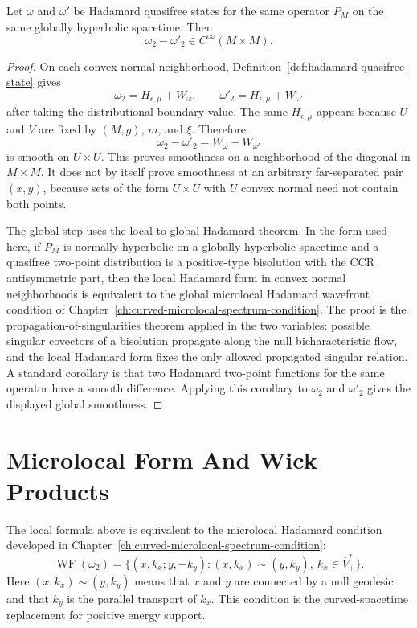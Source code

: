\begin{proposition}
\label{prop:hadamard-state-independent-subtraction}
Let \(\omega\) and \(\omega'\) be Hadamard quasifree states for the same
operator \(P_M\) on the same globally hyperbolic spacetime.  Then
\[
  \omega_2-\omega'_2\in C^\infty(M\times M).
\]
\end{proposition}

\begin{proof}
On each convex normal neighborhood, Definition~\ref{def:hadamard-quasifree-state}
gives
\[
  \omega_2=H_{\epsilon,\mu}+W_\omega,
  \qquad
  \omega'_2=H_{\epsilon,\mu}+W_{\omega'}
\]
after taking the distributional boundary value.  The same
\(H_{\epsilon,\mu}\) appears because \(U\) and \(V\) are fixed by
\((M,g)\), \(m\), and \(\xi\).  Therefore
\[
  \omega_2-\omega'_2=W_\omega-W_{\omega'}
\]
is smooth on \(U\times U\).  This proves smoothness on a neighborhood of the
diagonal in \(M\times M\).  It does not by itself prove smoothness at an
arbitrary far-separated pair \((x,y)\), because sets of the form \(U\times U\)
with \(U\) convex normal need not contain both points.

The global step uses the local-to-global Hadamard theorem.  In the form used
here, if \(P_M\) is normally hyperbolic on a globally hyperbolic spacetime and
a quasifree two-point distribution is a positive-type bisolution with the
CCR antisymmetric part, then the local Hadamard form in convex normal
neighborhoods is equivalent to the global microlocal Hadamard wavefront
condition of Chapter~\ref{ch:curved-microlocal-spectrum-condition}.  The
proof is the propagation-of-singularities theorem applied in the two
variables: possible singular covectors of a bisolution propagate along the
null bicharacteristic flow, and the local Hadamard form fixes the only
allowed propagated singular relation.  A standard corollary is that two
Hadamard two-point functions for the same operator have a smooth difference.
Applying this corollary to \(\omega_2\) and \(\omega'_2\) gives the displayed
global smoothness.
\end{proof}

\section{Microlocal Form And Wick Products}

The local formula above is equivalent to the microlocal Hadamard condition
developed in Chapter~\ref{ch:curved-microlocal-spectrum-condition}:
\[
  \operatorname{WF}(\omega_2)
  =
  \{(x,k_x;y,-k_y): (x,k_x)\sim(y,k_y),\ k_x\in\overline V_+^*\}.
\]
Here \((x,k_x)\sim(y,k_y)\) means that \(x\) and \(y\) are connected by a
null geodesic and that \(k_y\) is the parallel transport of \(k_x\).  This
condition is the curved-spacetime replacement for positive energy support.

